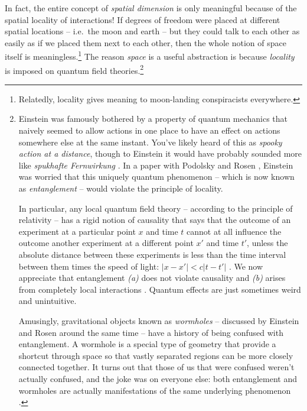 \documentclass[12pt]{article}
\begin{document}
In fact, the entire concept of \emph{spatial dimension} is only meaningful because of the spatial locality of interactions! If degrees of freedom were placed at different spatial locations -- i.e.~the moon and earth -- but they could talk to each other as easily as if we placed them next to each other, then the whole notion of space itself is meaningless.\footnote{
    Relatedly, locality gives meaning to moon-landing conspiracists everywhere.
} The reason \emph{space} is a useful abstraction is because \emph{locality} is imposed on quantum field theories.\footnote{
Einstein was famously bothered by a property of quantum mechanics that naively seemed to allow actions in one place to have an effect on actions somewhere else at the same instant.
You've likely heard of this as \emph{spooky action at a distance}, though to Einstein it would have probably sounded more like \emph{spukhafte Fernwirkung} \cite{einsteinborn}.
In a paper with Podolsky and Rosen \cite{Einstein:1935rr}, Einstein was worried that this uniquely quantum phenomenon -- which is now known as \emph{entanglement} -- would violate the principle of locality. 

In particular, any local 
quantum field theory -- according to the principle of relativity -- has a rigid notion of causality that says that the outcome of an experiment at a particular point $x$ and time $t$ cannot at all influence the outcome another experiment at a different point $x'$ and time $t'$, unless the absolute distance between these experiments is less than the time interval between them times the speed of light: $|x-x'| < c|t-t'|$ \cite{Streater:1989vi}. We now appreciate that entanglement \emph{(a)} does not violate causality and \emph{(b)} arises from completely local interactions \cite{bell1964einstein}. Quantum effects are just sometimes weird and unintuitive.

Amusingly, gravitational objects known as \emph{wormholes} -- discussed by Einstein and Rosen around the same time \cite{Einstein:1935tc}  -- have a history of being confused with entanglement. A wormhole is a special type of geometry that provide a shortcut through space so that vastly separated regions can be more closely connected together. It turns out that those of us that were confused weren't actually confused, and the joke was on everyone else: both entanglement and wormholes are actually manifestations of the same underlying phenomenon \cite{Maldacena:2013xja}.
}
\end{document}

